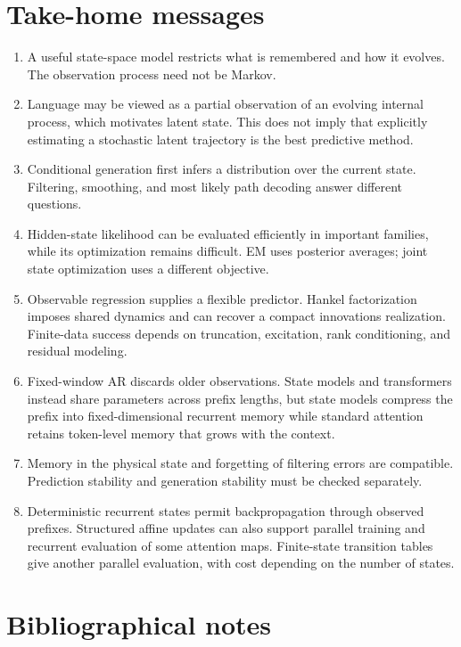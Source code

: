 \documentclass[11pt,twoside]{article}
\theoremstyle{definition}
\theoremstyle{remark}
\begin{document}
\section{Take-home messages}
\label{sec:take-home}
\begin{enumerate}[leftmargin=*,itemsep=.2em]
\item A useful state-space model restricts what is remembered and how it
evolves. The observation process need not be Markov.
\item Language may be viewed as a partial observation of an evolving internal
process, which motivates latent state. This does not imply that explicitly
estimating a stochastic latent trajectory is the best predictive method.
\item Conditional generation first infers a distribution over the current
state. Filtering, smoothing, and most likely path decoding answer
different questions.
\item Hidden-state likelihood can be evaluated efficiently in important
families, while its optimization remains difficult. EM uses posterior
averages; joint state optimization uses a different objective.
\item Observable regression supplies a flexible predictor. Hankel
factorization imposes shared dynamics and can recover a compact
innovations realization. Finite-data success depends on truncation,
excitation, rank conditioning, and residual modeling.
\item Fixed-window AR discards older observations. State models and
transformers instead share parameters across prefix lengths, but state models
compress the prefix into fixed-dimensional recurrent memory while standard
attention retains token-level memory that grows with the context.
\item Memory in the physical state and forgetting of filtering errors
are compatible. Prediction stability and generation stability must
be checked separately.
\item Deterministic recurrent states permit backpropagation through
observed prefixes. Structured affine updates can also support parallel
training and recurrent evaluation of some attention maps. Finite-state
transition tables give another parallel evaluation, with cost depending
on the number of states.
\end{enumerate}

\clearpage
\printendnotes

\section*{Bibliographical notes}
\label{sec:bibliographical-notes}
\end{document}

